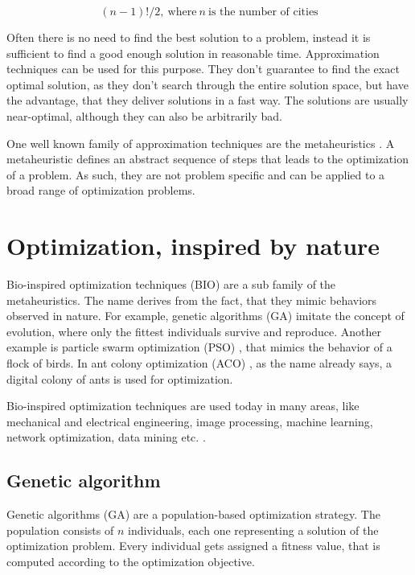 \begin{equation}\label{eq:tsp-cities}
  (n - 1)! / 2, \ \mbox{where} \ n \ \mbox{is the number of cities}
\end{equation}

Often there is no need to find the best solution to a problem, instead it is sufficient to find a good enough solution in reasonable time. Approximation techniques can be used for this purpose. They don't guarantee to find the exact optimal solution, as they don't search through the entire solution space, but have the advantage, that they deliver solutions in a fast way. The solutions are usually near-optimal, although they can also be arbitrarily bad.

One well known family of approximation techniques are the metaheuristics \cite{yang2010nature}. A metaheuristic defines an abstract sequence of steps that leads to the optimization of a problem. As such, they are not problem specific and can be applied to a broad range of optimization problems.

\section{Optimization, inspired by nature}
Bio-inspired optimization techniques (BIO) are a sub family of the metaheuristics. The name derives from the fact, that they mimic behaviors observed in nature. For example, genetic algorithms (GA) \cite{sivanandam2008genetic} imitate the concept of evolution, where only the fittest individuals survive and reproduce. Another example is particle swarm optimization (PSO) \cite{kennedy2010particle}, that mimics the behavior of a flock of birds. In ant colony optimization (ACO) \cite{dorigo2010ant}, as the name already says, a digital colony of ants is used for optimization.

Bio-inspired optimization techniques are used today in many areas, like mechanical and electrical engineering, image processing, machine learning, network optimization, data mining etc. \cite{sivanandam2008genetic}.

\subsection{Genetic algorithm}
Genetic algorithms (GA) are a population-based optimization strategy. The population consists of $n$ individuals, each one representing a solution of the optimization problem. Every individual gets assigned a fitness value, that is computed according to the optimization objective.

